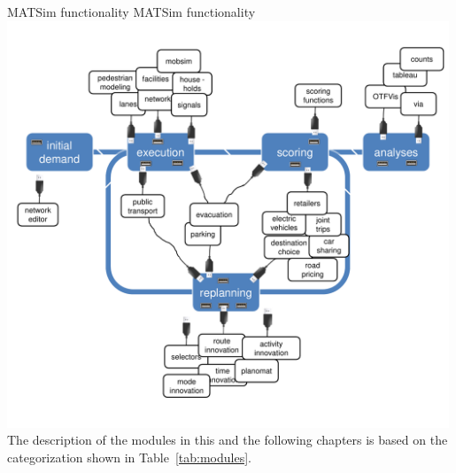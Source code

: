 \createfigure%
{MATSim functionality}%
{MATSim functionality}%
{\label{fig:matsimmodules}}%
{\includegraphics[width=0.99\textwidth, angle=0]{extending/figures/modules.pdf}}%
{}
%
The description of the modules in this and the following chapters is based on the categorization shown in Table~\ref{tab:modules}.
%

